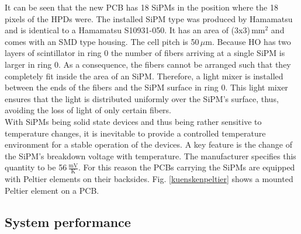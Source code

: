 It can be seen that the new PCB has 18 SiPMs in the position where the 18 pixels of the HPDs were.
The installed SiPM type was produced by Hamamatsu and is identical to a Hamamatsu S10931-050. It has an area of (3x3)\,mm$^2$ and comes with an SMD type housing. The cell pitch is 50\,$\mu$m.
Because HO has two layers of scintillator in ring 0 the number of fibers arriving at a single SiPM is larger in ring 0. As a consequence, the fibers cannot be arranged such that they completely fit inside the area of an SiPM. Therefore, a light mixer is installed between the ends of the fibers and the SiPM surface in ring 0. This light mixer
ensures that the light is distributed uniformly over the SiPM's surface, thus, avoiding the loss of light of only certain fibers.\\
With SiPMs being solid state devices and thus being rather sensitive to temperature changes, it is inevitable to provide a controlled temperature environment for a stable operation of the devices. A key feature is the change of the SiPM's breakdown voltage with temperature. The manufacturer specifies this quantity to be 56\,$\frac{\text{mV}}{\text{K}}$. For this reason the PCBs carrying the SiPMs are equipped with Peltier elements on their backsides. Fig. \ref{kuenskenpeltier} shows a mounted Peltier element on a PCB.
\subsection{System performance}
